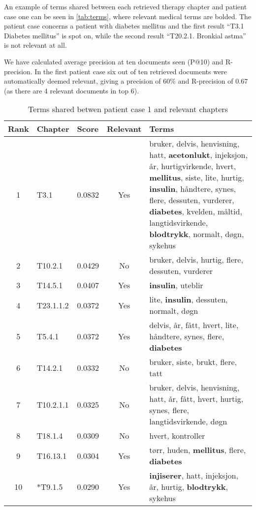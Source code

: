 \documentclass[a4paper, 11pt]{article}
\begin{document}
An example of terms shared between each retrieved therapy
chapter and patient case one can be seen in \autoref{tab:terms}, where
relevant medical terms are bolded. The patient case concerns a patient with
diabetes mellitus and the first result ``T3.1 Diabetes mellitus'' is spot on,
while the second result ``T20.2.1. Bronkial astma'' is not relevant at all.

We have calculated average precision at ten documents seen (P@10) and
R-precision. In the first patient case six out of ten retrieved documents were
automatically deemed relevant, giving a precision of \( 60\% \) and
R-precision of \( 0.67 \) (as there are 4 relevant documents in top 6).

\begin{table}[tbp] \footnotesize \center
\caption{Terms shared betwen patient case 1 and relevant chapters\label{tab:terms}}
\begin{tabularx}{\textwidth}{c l l c X}
    \toprule
    Rank & Chapter & Score & Relevant & Terms \\
    \midrule
	1 & T3.1 & 0.0832 & Yes & bruker, delvis, henvisning, hatt, \textbf{acetonlukt}, injeksjon, år, hurtigvirkende, hvert, \textbf{mellitus}, siste, lite, hurtig, \textbf{insulin}, håndtere, synes, flere, dessuten, vurderer, \textbf{diabetes}, kvelden, måltid, langtidsvirkende, \textbf{blodtrykk}, normalt, døgn, sykehus \\
	2 & T10.2.1 & 0.0429 & No & bruker, delvis, hurtig, flere, dessuten, vurderer \\
	3 & T14.5.1 & 0.0407 & Yes & \textbf{insulin}, uteblir \\
	4 & T23.1.1.2 & 0.0372 & Yes & lite, \textbf{insulin}, dessuten, normalt, døgn \\
	5 & T5.4.1 & 0.0372 & Yes & delvis, år, fått, hvert, lite, håndtere, synes, flere, \textbf{diabetes} \\
	6 & T14.2.1 & 0.0332 & No & bruker, siste, brukt, flere, tatt \\
	7 & T10.2.1.1 & 0.0325 & No & bruker, delvis, henvisning, hatt, år, fått, hvert, hurtig, synes, flere, langtidsvirkende, døgn \\
	8 & T18.1.4 & 0.0309 & No & hvert, kontroller \\
	9 & T16.13.1 & 0.0304 & Yes & tørr, huden, \textbf{mellitus}, flere, \textbf{diabetes} \\
	10 & *T9.1.5 & 0.0290 & Yes & \textbf{injiserer}, hatt, injeksjon, år, hurtig, \textbf{blodtrykk}, sykehus \\
	\bottomrule
\end{tabularx}
\end{table}
\end{document}
